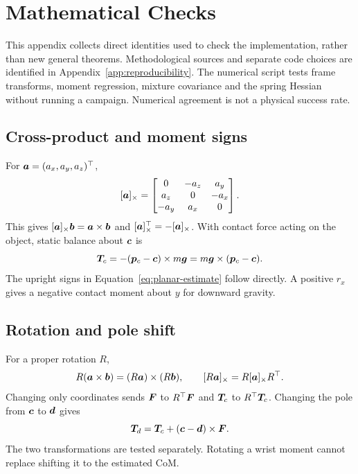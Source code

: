 \chapter{Mathematical Checks}
\label{app:math}

This appendix collects direct identities used to check the implementation, rather than new general theorems. Methodological sources and separate code choices are identified in Appendix~\ref{app:reproducibility}. The numerical script tests frame transforms, moment regression, mixture covariance and the spring Hessian without running a campaign. Numerical agreement is not a physical success rate.

\section{Cross-product and moment signs}

For $\bm{a}=(a_x,a_y,a_z)^\top$,
\begin{equation}
[\bm{a}]_{\times}=\begin{bmatrix}0&-a_z&a_y\\a_z&0&-a_x\\-a_y&a_x&0\end{bmatrix}.
\end{equation}
This gives $[\bm{a}]_{\times}\bm{b}=\bm{a}\times\bm{b}$ and $[\bm{a}]_{\times}^\top=-[\bm{a}]_{\times}$. With contact force acting on the object, static balance about $\bm{c}$ is
\begin{equation}
\bm{T}_c=-(\bm{p}_c-\bm{c})\times m\bm{g}
=m\bm{g}\times(\bm{p}_c-\bm{c}).
\end{equation}
The upright signs in Equation~\eqref{eq:planar-estimate} follow directly. A positive $r_x$ gives a negative contact moment about $y$ for downward gravity.

\section{Rotation and pole shift}

For a proper rotation $R$,
\begin{equation}
R(\bm{a}\times\bm{b})=(R\bm{a})\times(R\bm{b}),\qquad
[R\bm{a}]_{\times}=R[\bm{a}]_{\times}R^\top.
\end{equation}
Changing only coordinates sends $\bm{F}$ to $R^\top\bm{F}$ and $\bm{T}_c$ to $R^\top\bm{T}_c$. Changing the pole from $\bm{c}$ to $\bm{d}$ gives
\begin{equation}
\bm{T}_d=\bm{T}_c+(\bm{c}-\bm{d})\times\bm{F}.
\end{equation}
The two transformations are tested separately. Rotating a wrist moment cannot replace shifting it to the estimated CoM.

